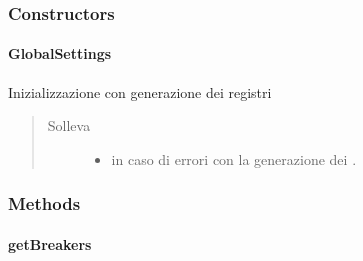 \documentclass[letterpaper,10pt,italian,openany,oneside]{sphinxmanual}
\begin{document}
\subsubsection{Constructors}
\label{\detokenize{source/it/unicam/cs/pa/mastermind/gamecore/GlobalSettings:constructors}}

\paragraph{GlobalSettings}
\label{\detokenize{source/it/unicam/cs/pa/mastermind/gamecore/GlobalSettings:id1}}

\begin{fulllineitems}
\label{\detokenize{source/it/unicam/cs/pa/mastermind/gamecore/GlobalSettings:it.unicam.cs.pa.mastermind.gamecore.GlobalSettings.GlobalSettings()}}
Inizializzazione con generazione dei registri
\begin{quote}\begin{description}
\item[{Solleva}] \leavevmode\begin{itemize}
\item {} 
 \textendash{} in caso di errori con la generazione dei .

\end{itemize}

\end{description}\end{quote}

\end{fulllineitems}



\subsubsection{Methods}
\label{\detokenize{source/it/unicam/cs/pa/mastermind/gamecore/GlobalSettings:methods}}

\paragraph{getBreakers}
\label{\detokenize{source/it/unicam/cs/pa/mastermind/gamecore/GlobalSettings:getbreakers}}
\end{document}
